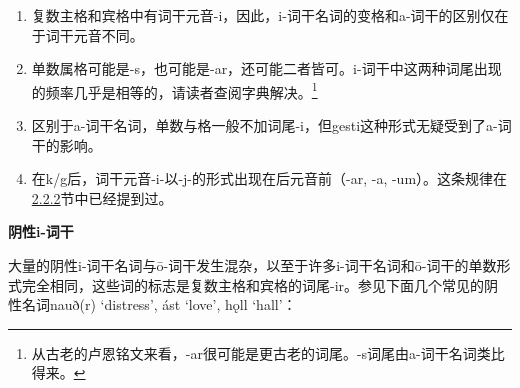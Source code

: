 \begin{enumerate}
  \def\labelenumi{\arabic{enumi})}
  \item
        复数主格和宾格中有词干元音-i，因此，i-词干名词的变格和a-词干的区别仅在于词干元音不同。
  \item
        单数属格可能是-s，也可能是-ar，还可能二者皆可。i-词干中这两种词尾出现的频率几乎是相等的，请读者查阅字典解决。\footnote{从古老的卢恩铭文来看，-ar很可能是更古老的词尾。-s词尾由a-词干名词类比得来。}
  \item
        区别于a-词干名词，单数与格一般不加词尾-i，但gesti这种形式无疑受到了a-词干的影响。
  \item
        在k/g后，词干元音-i-以-j-的形式出现在后元音前（-ar, -a,
        -um）。这条规律在\hyperref[ajawa-ux8bcdux5e72]{2.2.2}节中已经提到过。
\end{enumerate}

\textbf{阴性i-词干}

大量的阴性i-词干名词与ō-词干发生混杂，以至于许多i-词干名词和ō-词干的单数形式完全相同，这些词的标志是复数主格和宾格的词尾-ir。参见下面几个常见的阴性名词nauð(r)
`distress', ást `love', hǫll `hall'：

